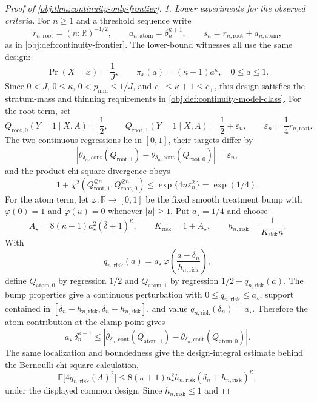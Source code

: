 \documentclass[11pt]{article}
\begin{document}
\begin{proof}[Proof of \cref{obj:thm:continuity-only-frontier}]
\emph{1. Lower experiments for the observed criteria.}
For \(n\geq1\) and a threshold sequence write
\[
r_{n,\mathrm{root}}=(n:\mathbb R)^{-1/2},
\qquad
a_{n,\mathrm{atom}}=\delta_n^{\kappa+1},
\qquad
s_n=r_{n,\mathrm{root}}+a_{n,\mathrm{atom}},
\]
as in \cref{obj:def:continuity-frontier}.  The lower-bound witnesses all use the same design:
\[
\Pr(X=x)=\frac1J,\qquad
\pi_x(a)=(\kappa+1)a^\kappa,\quad 0\leq a\leq1 .
\]
Since \(0<J\), \(0\leq\kappa\), \(0<p_{\min}\leq1/J\), and
\(c_-\leq\kappa+1\leq c_+\), this design satisfies the stratum-mass and thinning requirements in
\cref{obj:def:continuity-model-class}.  For the root term, set
\[
Q_{\mathrm{root},0}(Y=1\mid X,A)=\frac12,\qquad
Q_{\mathrm{root},1}(Y=1\mid X,A)=\frac12+\varepsilon_n,
\qquad
\varepsilon_n=\frac14 r_{n,\mathrm{root}} .
\]
The two continuous regressions lie in \([0,1]\), their targets differ by
\[
\left|
\theta_{\delta_n,\mathrm{cont}}(Q_{\mathrm{root},1})
-\theta_{\delta_n,\mathrm{cont}}(Q_{\mathrm{root},0})
\right|
=\varepsilon_n,
\]
and the product chi-square divergence obeys
\[
1+\chi^2(Q_{\mathrm{root},1}^{\otimes n},Q_{\mathrm{root},0}^{\otimes n})
\leq \exp\{4n\varepsilon_n^2\}=\exp(1/4).
\]
For the atom term, let \(\varphi:\mathbb R\to[0,1]\) be the fixed smooth treatment bump with
\(\varphi(0)=1\) and \(\varphi(u)=0\) whenever \(|u|\geq1\).  Put \(a_\star=1/4\) and choose
\[
A_\star=8(\kappa+1)a_\star^2(\bar\delta+1)^\kappa,
\qquad
K_{\mathrm{risk}}=1+A_\star,
\qquad
h_{n,\mathrm{risk}}=\frac1{K_{\mathrm{risk}}n}.
\]
With
\[
q_{n,\mathrm{risk}}(a)=a_\star\,
\varphi\!\left(\frac{a-\delta_n}{h_{n,\mathrm{risk}}}\right),
\]
define \(Q_{\mathrm{atom},0}\) by regression \(1/2\) and \(Q_{\mathrm{atom},1}\) by regression
\(1/2+q_{n,\mathrm{risk}}(a)\).  The bump properties give a continuous perturbation with
\(0\leq q_{n,\mathrm{risk}}\leq a_\star\), support contained in
\([\delta_n-h_{n,\mathrm{risk}},\delta_n+h_{n,\mathrm{risk}}]\), and value
\(q_{n,\mathrm{risk}}(\delta_n)=a_\star\).  Therefore the atom contribution at the clamp point gives
\[
a_\star\,\delta_n^{\kappa+1}
\leq
\left|
\theta_{\delta_n,\mathrm{cont}}(Q_{\mathrm{atom},1})
-\theta_{\delta_n,\mathrm{cont}}(Q_{\mathrm{atom},0})
\right|.
\]
The same localization and boundedness give the design-integral estimate behind the Bernoulli
chi-square calculation,
\[
\mathbb E\!\bigl[4q_{n,\mathrm{risk}}(A)^2\bigr]
\leq
8(\kappa+1)a_\star^2h_{n,\mathrm{risk}}
(\delta_n+h_{n,\mathrm{risk}})^\kappa,
\]
under the displayed common design.  Since \(h_{n,\mathrm{risk}}\leq1\) and

\end{proof}
\end{document}

